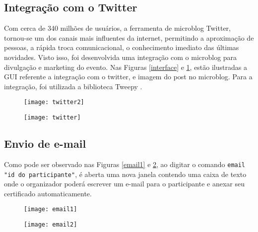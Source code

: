 \documentclass[tcc,capa]{texufpel}
\begin{document}
        \subsection{Integração com o Twitter}
        
            Com cerca de 340 milhões de usuários, a ferramenta de microblog Twitter, tornou-se um dos canais mais influentes da internet, permitindo a aproximação de pessoas, a rápida troca comunicacional, o conhecimento imediato das últimas novidades.
            Visto isso, foi desenvolvida uma integração com o microblog para divulgação e marketing do evento.%
            Nas Figuras \ref{interface} e \ref{twit}, estão ilustradas a GUI referente a integração com o twitter, e imagem do post no microblog. Para a integração, foi utilizada a biblioteca Tweepy \cite{tweetpy:2015:Online}. 
            
            \begin{figure}[H]
            \centering
            \begin{minipage}{.3\linewidth}
              \texttt{[image: twitter2]}
              \label{interface}
            \end{minipage}
            \hspace{.05\linewidth}
            \begin{minipage}{.3\linewidth}
              \texttt{[image: twitter]}
              \label{twit}
            \end{minipage}
            \end{figure}
    
    
        \subsection{Envio de e-mail}
        
            Como pode ser observado nas Figuras \ref{email1} e \ref{email2}, ao digitar o comando \texttt{email "id do participante"}, é aberta uma nova janela contendo uma caixa de texto onde o organizador poderá escrever um e-mail para o participante e anexar seu certificado automaticamente.
            
            \begin{figure}[H]
                \centering
                \begin{minipage}{.6\linewidth}
                  \texttt{[image: email1]}
                  \label{email1}
                \end{minipage}
                \hspace{.05\linewidth}
                \begin{minipage}{.3\linewidth}
                  \texttt{[image: email2]}
                  \label{email2}
                \end{minipage}
            \end{figure}
    
\end{document}
